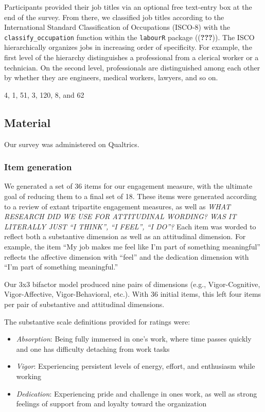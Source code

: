 \documentclass[
  english,
  man]{apa6}
\begin{document}
Participants provided their job titles via an optional free text-entry box at the end of the survey. From there, we classified job titles according to the International Standard Classification of Occupations (ISCO-8) with the \texttt{classify\_occupation} function within the \texttt{labourR} package (({\textbf{???}})). The ISCO hierarchically organizes jobs in increasing order of specificity. For example, the first level of the hierarchy distinguishes a professional from a clerical worker or a technician. On the second level, professionals are distinguished among each other by whether they are engineers, medical workers, lawyers, and so on.

4, 1, 51, 3, 120, 8, and 62

\hypertarget{material}{%
\subsection{Material}\label{material}}

Our survey was administered on Qualtrics.

\hypertarget{item-generation}{%
\subsubsection{Item generation}\label{item-generation}}

We generated a set of 36 items for our engagement measure, with the ultimate goal of reducing them to a final set of 18. These items were generated according to a review of extant tripartite engagement measures, as well as \emph{WHAT RESEARCH DID WE USE FOR ATTITUDINAL WORDING? WAS IT LITERALLY JUST \enquote{I THINK}, \enquote{I FEEL}, \enquote{I DO}?} Each item was worded to reflect both a substantive dimension as well as an attitudinal dimension. For example, the item \enquote{My job makes me feel like I'm part of something meaningful} reflects the affective dimension with \enquote{feel} and the dedication dimension with \enquote{I'm part of something meaningful.}

Our 3x3 bifactor model produced nine pairs of dimensions (e.g., Vigor-Cognitive, Vigor-Affective, Vigor-Behavioral, etc.). With 36 initial items, this left four items per pair of substantive and attitudinal dimensions.

The substantive scale definitions provided for ratings were:

\begin{itemize}
\item
  \emph{Absorption}: Being fully immersed in one's work, where time passes quickly and one has difficulty detaching from work tasks
\item
  \emph{Vigor}: Experiencing persistent levels of energy, effort, and enthusiasm while working
\item
  \emph{Dedication}: Experiencing pride and challenge in ones work, as well as strong feelings of support from and loyalty toward the organization
\end{itemize}
\end{document}
